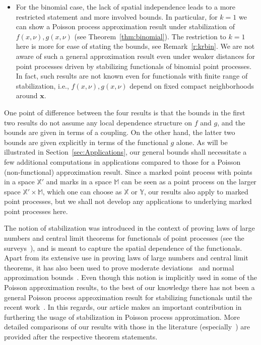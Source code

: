 \documentclass[AHL,Unicode,longabstracts]{cedram}
\newcommand{\bx}{\mathbf{x}}
\newcommand{\bbM}{\mathbb{M}}
\newcommand*\X{\mathbb{X}}
\newcommand*\Y{\mathbb{Y}}
\begin{document}
\begin{itemize}
\item For the binomial case, the lack of spatial independence leads to a more restricted statement and more involved bounds. In particular, for $k = 1$ we can show a Poisson process approximation result under {stabilization} of $f(x,\nu), g(x,\nu)$ (see Theorem~\ref{thm:binomial}). The restriction to $k=1$ here is more for ease of stating the bounds, see Remark~\ref{r:krbin}. We are not aware of such a general approximation result even under weaker distances for point processes driven by stabilizing functionals of binomial point processes. In fact, such results are not known even for functionals with finite range of stabilization, i.e., $f(x,\nu), g(x,\nu)$ depend on fixed compact neighborhoods around $\bx$.
\end{itemize}

One point of difference between the four results is that the bounds in the first two results do not assume any local dependence structure on $f$ and $g$, and the bounds are given in terms of a coupling. On the other hand, the latter two bounds are given explicitly in terms of the functional $g$ alone. As will be illustrated in Section~\ref{sec:Applications}, our general bounds shall necessitate a few additional computations in applications compared to those for a Poisson (non-functional) approximation result. Since a marked point process with points in a space $\X'$ and marks in a space $\bbM$ can be seen as a point process on the larger space $\X'\times \bbM$, which one can choose as $\X$ or $\Y$, our results also apply to marked point processes, but we shall not develop any applications to underlying marked point processes here.

\begin{rema}\label{r:stab}
The notion of stabilization was introduced in the context of proving laws of large numbers and central limit theorems for functionals of point processes (see the surveys~\cite{Schreiber2010,Yukich2013}), and is meant to capture the spatial dependence of the functionals. Apart from its extensive use in proving laws of large numbers and central limit theorems, it has also been used to prove moderate deviations~\cite{Eichelsbacher2015} and normal approximation bounds~\cite{Lachieze2019}. Even though this notion is implicitly used in some of the Poisson approximation results, to the best of our knowledge there has not been a general Poisson process approximation result for stabilizing functionals until the recent work~\cite{Otto2020}. In this regards, our article makes an important contribution in furthering the usage of stabilization in Poisson process approximation. More detailed comparisons of our results with those in the literature (especially~\cite{Barbour1992,decreusefond_functional_2016,Otto2020}) are provided after the respective theorem statements.
\end{rema}
\end{document}
